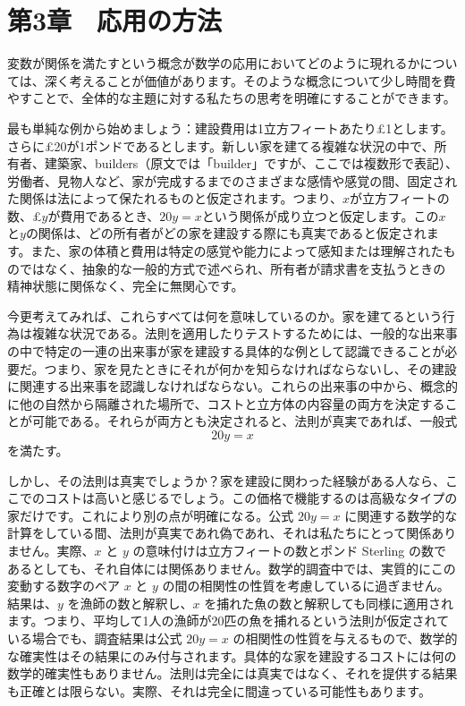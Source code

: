 \documentclass[a4paper,11pt,openany]{ltjsbook}
\begin{document}
\chapter{第3章　応用の方法}

変数が関係を満たすという概念が数学の応用においてどのように現れるかについては、深く考えることが価値があります。そのような概念について少し時間を費やすことで、全体的な主題に対する私たちの思考を明確にすることができます。

最も単純な例から始めましょう：建設費用は1立方フィートあたり£1とします。さらに£20が1ポンドであるとします。新しい家を建てる複雑な状況の中で、所有者、建築家、builders（原文では「builder」ですが、ここでは複数形で表記）、労働者、見物人など、家が完成するまでのさまざまな感情や感覚の間、固定された関係は法によって保たれるものと仮定されます。つまり、$x$が立方フィートの数、£$y$が費用であるとき、$20y = x$という関係が成り立つと仮定します。この$x$と$y$の関係は、どの所有者がどの家を建設する際にも真実であると仮定されます。また、家の体積と費用は特定の感覚や能力によって感知または理解されたものではなく、抽象的な一般的方式で述べられ、所有者が請求書を支払うときの精神状態に関係なく、完全に無関心です。

今更考えてみれば、これらすべては何を意味しているのか。家を建てるという行為は複雑な状況である。法則を適用したりテストするためには、一般的な出来事の中で特定の一連の出来事が家を建設する具体的な例として認識できることが必要だ。つまり、家を見たときにそれが何かを知らなければならないし、その建設に関連する出来事を認識しなければならない。これらの出来事の中から、概念的に他の自然から隔離された場所で、コストと立方体の内容量の両方を決定することが可能である。それらが両方とも決定されると、法則が真実であれば、一般式
\[
20y = x
\]
を満たす。

しかし、その法則は真実でしょうか？家を建設に関わった経験がある人なら、ここでのコストは高いと感じるでしょう。この価格で機能するのは高級なタイプの家だけです。これにより別の点が明確になる。公式 $20y = x$ に関連する数学的な計算をしている間、法則が真実であれ偽であれ、それは私たちにとって関係ありません。実際、$x$ と $y$ の意味付けは立方フィートの数とポンド Sterling の数であるとしても、それ自体には関係ありません。数学的調査中では、実質的にこの変動する数字のペア $x$ と $y$ の間の相関性の性質を考慮しているに過ぎません。結果は、$y$ を漁師の数と解釈し、$x$ を捕れた魚の数と解釈しても同様に適用されます。つまり、平均して1人の漁師が20匹の魚を捕れるという法則が仮定されている場合でも、調査結果は公式 $20y = x$ の相関性の性質を与えるもので、数学的な確実性はその結果にのみ付与されます。具体的な家を建設するコストには何の数学的確実性もありません。法則は完全には真実ではなく、それを提供する結果も正確とは限らない。実際、それは完全に間違っている可能性もあります。
\end{document}
